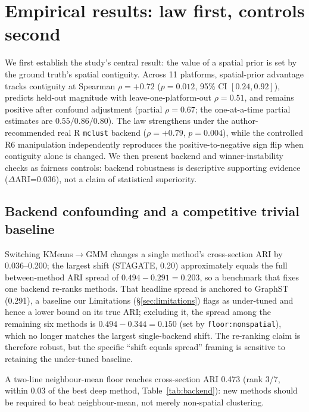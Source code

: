 \documentclass[journal]{IEEEtran}
\begin{document}
\section{Empirical results: law first, controls second}\label{sec:empirical}
We first establish the study's central result: the value of a spatial prior is set by the ground truth's spatial contiguity. Across 11 platforms, spatial-prior advantage tracks contiguity at Spearman $\rho=+0.72$ ($p=0.012$, 95\% CI $[0.24,0.92]$), predicts held-out magnitude with leave-one-platform-out $\rho=0.51$, and remains positive after confound adjustment (partial $\rho=0.67$; the one-at-a-time partial estimates are $0.55/0.86/0.80$). The law strengthens under the author-recommended real R \texttt{mclust} backend ($\rho=+0.79$, $p=0.004$), while the controlled R6 manipulation independently reproduces the positive-to-negative sign flip when contiguity alone is changed. We then present backend and winner-instability checks as fairness controls: backend robustness is descriptive supporting evidence ($\Delta$ARI=0.036), not a claim of statistical superiority.

\subsection{Backend confounding and a competitive trivial baseline}\label{sec:confound}
Switching KMeans${\to}$GMM changes a single method's cross-section ARI by 0.036--0.200; the largest shift
(STAGATE, 0.20) approximately equals the full between-method ARI spread of $0.494-0.291=0.203$, so a
benchmark that fixes one backend re-ranks methods. That headline spread is anchored to GraphST (0.291),
a baseline our Limitations (\S\ref{sec:limitations}) flags as under-tuned and hence a lower bound on its
true ARI; excluding it, the spread among the remaining six methods is $0.494-0.344=0.150$ (set by
\texttt{floor:nonspatial}), which no longer matches the largest single-backend shift. The re-ranking claim
is therefore robust, but the specific ``shift equals spread'' framing is sensitive to retaining the
under-tuned baseline.

A two-line neighbour-mean floor reaches cross-section ARI 0.473 (rank 3/7,
within 0.03 of the best deep method, Table~\ref{tab:backend}): new methods should be required to beat
neighbour-mean, not merely non-spatial clustering.
\end{document}
